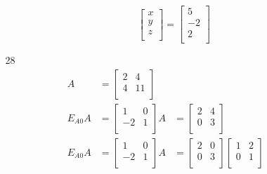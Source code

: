 \documentclass[12pt,letterpaper]{article}
\begin{document}
\begin{enumerate}
\begin{enumerate}
\begin{itemize}
              \[
                \begin{bmatrix}
                  x \\
                  y \\
                  z \\
                \end{bmatrix}
                =
                \begin{bmatrix}
                   5 \\
                  -2 \\
                   2 \\
                \end{bmatrix}
              \]
          \end{itemize}
        \item [28]
          \begin{align*}
            A
            &=
            \begin{bmatrix}
               2 &  4 \\
               4 & 11 \\
            \end{bmatrix}
            \\
            E_{A0}A
            &=
            \begin{bmatrix}
               1 &  0 \\
              -2 &  1 \\
            \end{bmatrix}
            A
            &=
            \begin{bmatrix}
               2 &  4 \\
               0 &  3 \\
            \end{bmatrix}
            \\
            E_{A0}A
            &=
            \begin{bmatrix}
               1 &  0 \\
              -2 &  1 \\
            \end{bmatrix}
            A
            &=
            \begin{bmatrix}
               2 &  0 \\
               0 &  3 \\
            \end{bmatrix}
            \begin{bmatrix}
               1 &  2 \\
               0 &  1 \\
            \end{bmatrix}
            \\
          \end{align*}


\end{enumerate}
\end{enumerate}
\end{document}

